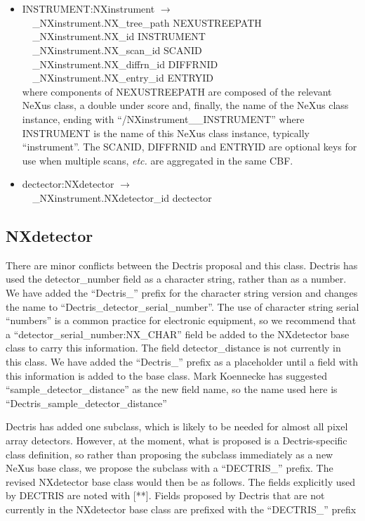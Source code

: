 \documentclass[11pt]{article}
\begin{document}
{{\begin{itemize}

\item{INSTRUMENT:NXinstrument $\rightarrow$\\
\verb|  |\_NXinstrument.NX\_tree\_path    NEXUSTREEPATH \\
\verb|  |\_NXinstrument.NX\_id            INSTRUMENT \\
\verb|  |\_NXinstrument.NX\_scan\_id      SCANID \\
\verb|  |\_NXinstrument.NX\_diffrn\_id    DIFFRNID \\
\verb|  |\_NXinstrument.NX\_entry\_id     ENTRYID \\
where components of NEXUSTREEPATH are composed of the
relevant NeXus class, a double under score and, finally, the
name of the NeXus class instance, ending with 
``/NXinstrument\_\_INSTRUMENT''
where INSTRUMENT is the name of this NeXus class instance, typically ``instrument''.
The SCANID, DIFFRNID and ENTRYID are optional keys for use
when multiple scans, {\it etc.} are aggregated in the same CBF.}

\item{dectector:NXdetector $\rightarrow$\\
\verb|  |\_NXinstrument.NXdetector\_id dectector}
\end{itemize}


\subsection{NXdetector}

There are minor conflicts between the Dectris proposal and this class.
Dectris has used the detector\_number field as a character
string, rather than as a number.  We have added the
``Dectris\_'' prefix for the character string version and changes
the name to ``Dectris\_detector\_serial\_number''.
The use of character string serial ``numbers'' is a common
practice for electronic equipment, so we recommend that
a ``detector\_serial\_number:NX\_CHAR'' field be added
to the NXdetector base class to carry this information.
The field detector\_distance is not currently in this class.
We have added the ``Dectris\_'' prefix as a placeholder
until a field with this information is added to the
base class.  Mark Koennecke has suggested ``sample\_detector\_distance''
as the new field name, so the name used here is
``Dectris\_sample\_detector\_distance''

Dectris has added one subclass, which is likely to be
needed for almost all pixel array detectors.  However, at the
moment, what is proposed is a Dectris-specific class definition,
so rather than proposing the subclass immediately as a new NeXus 
base class, we propose the subclass with a ``DECTRIS\_'' prefix.
The revised NXdetector base class would then be as follows.
The fields explicitly used by DECTRIS are noted with [**].
Fields proposed by Dectris that are not currently in the
NXdetector base class are prefixed with the ``DECTRIS\_'' prefix

}}
\end{document}
